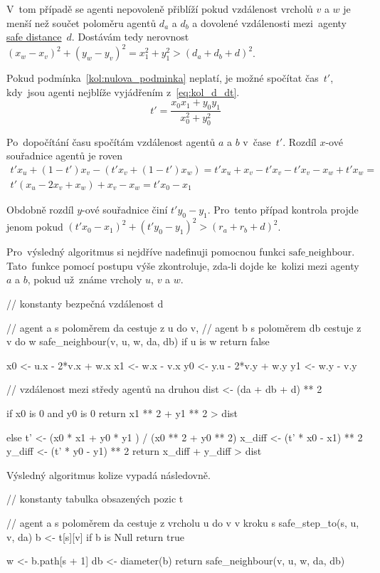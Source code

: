 V~tom případě se agenti nepovoleně přiblíží pokud vzdálenost vrcholů $v$ a $w$ je menší než
součet poloměru agentů $d_a$ a $d_b$ a dovolené vzdálenosti mezi~agenty \hyperref[par:safe_distance]{safe distance}~$d$.
Dostávám tedy nerovnost $(x_w - x_v)^2 + (y_w - y_v)^2 = x_1^2 + y_1^2 > (d_a + d_b + d)^2$.


Pokud podmínka~\ref{kol:nulova_podminka} neplatí, je možné spočítat čas~$t'$,
kdy~jsou agenti nejblíže vyjádřením z~\ref{eq:kol_d_dt}.
\begin{equation}
	\label{eq:kol_t}
	t' = \frac{x_0 x_1 + y_0 y_1}{x_0^2 + y_0^2}
\end{equation}

Po~dopočítání času spočítám vzdálenost agentů $a$ a $b$ v~čase~$t'$.
Rozdíl $x$-ové souřadnice agentů je roven
\begin{gather*}
	t' x_u + (1 - t')x_v - (t' x_v + (1 - t')x_w) =
	t' x_u + x_v - t' x_v - t' x_v - x_w + t' x_w = \\
	t'(x_u - 2x_v + x_w) + x_v - x_w =
	t' x_0 - x_1
\end{gather*}

Obdobně rozdíl $y$-ové souřadnice činí $t' y_0 - y_1$.
Pro~tento případ kontrola projde jenom pokud $(t' x_0 - x_1)^2 + (t' y_0 - y_1)^2 > (r_a + r_b + d)^2$.

Pro~výsledný algoritmus si nejdříve nadefinuji
pomocnou funkci $\textrm{safe\_neighbour}$.
Tato~funkce pomocí postupu výše zkontroluje, zda-li dojde ke~kolizi mezi agenty $a$ a $b$,
pokud už~známe vrcholy $u$, $v$ a $w$.
\begin{code}
// konstanty bezpečná vzdálenost d

// agent a s poloměrem da cestuje z u do v,
// agent b s poloměrem db cestuje z v do w
safe_neighbour(v, u, w, da, db)
if u is w return false

x0 <- u.x - 2*v.x + w.x
x1 <- w.x - v.x
y0 <- y.u - 2*v.y + w.y
y1 <- w.y - v.y

// vzdálenost mezi středy agentů na druhou
dist <- (da + db + d) ** 2

if x0 is 0 and y0 is 0
return x1 ** 2 + y1 ** 2 > dist

else
t' <- (x0 * x1 + y0 * y1 ) / (x0 ** 2 + y0 ** 2)
x_diff <- (t' * x0 - x1) ** 2
y_diff <- (t' * y0 - y1) ** 2
return x_diff + y_diff > dist
\end{code}
\label{alg:check_neighbour}

Výsledný algoritmus kolize vypadá následovně.
\begin{code}
// konstanty tabulka obsazených pozic t

// agent a s poloměrem da cestuje z vrcholu u do v v kroku s
safe_step_to(s, u, v, da)
b <- t[s][v]
if b is Null return true

w <- b.path[s + 1]
db <- diameter(b)
return safe_neighbour(v, u, w, da, db)
\end{code}

